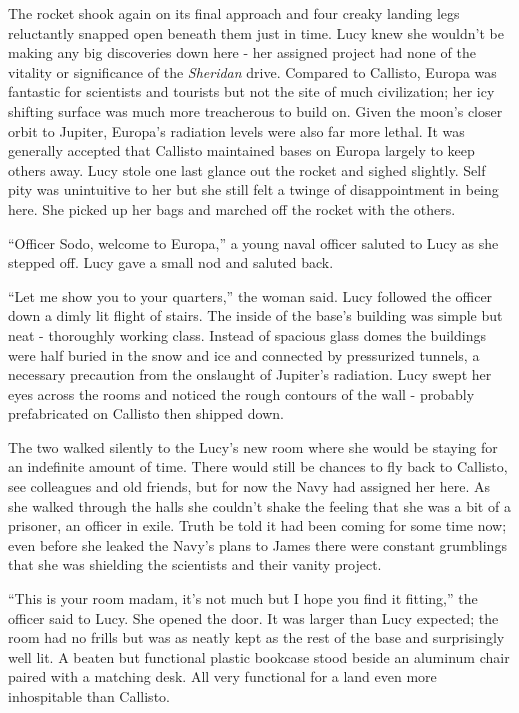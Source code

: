 \documentclass[12pt]{article} %
\begin{document}
The rocket shook again on its final approach and four creaky landing legs reluctantly snapped open beneath them just in time. Lucy knew she wouldn't be making any big discoveries down here - her assigned project had none of the vitality or significance of the \textit{Sheridan}  drive. Compared to Callisto, Europa was fantastic for scientists and tourists but not the site of much civilization; her icy shifting surface was much more treacherous to build on. Given the moon's closer orbit to Jupiter, Europa's radiation levels were also far more lethal. It was generally accepted that Callisto maintained bases on Europa largely to keep others away. Lucy stole one last glance out the rocket and sighed slightly. Self pity was unintuitive to her but she still felt a twinge of disappointment in being here. She picked up her bags and marched off the rocket with the others.

``Officer Sodo, welcome to Europa,'' a young naval officer saluted to Lucy as she stepped off. Lucy gave a small nod and saluted back.

 ``Let me show you to your quarters,'' the woman said. Lucy followed the officer down a dimly lit flight of stairs. The inside of the base's building was simple but neat - thoroughly working class. Instead of spacious glass domes the buildings were half buried in the snow and ice and connected by pressurized tunnels, a necessary precaution from the onslaught of Jupiter's radiation. Lucy swept her eyes across the rooms and noticed the rough contours of the wall - probably prefabricated on Callisto then shipped down.

The two walked silently to the Lucy's new room where she would be staying for an indefinite amount of time. There would still be chances to fly back to Callisto, see colleagues and old friends, but for now the Navy had assigned her here. As she walked through the halls she couldn't shake the feeling that she was a bit of a prisoner, an officer in exile. Truth be told it had been coming for some time now; even before she leaked the Navy's plans to James there were constant grumblings that she was shielding the scientists and their vanity project.

``This is your room madam, it's not much but I hope you find it fitting,'' the officer said to Lucy. She opened the door. It was larger than Lucy expected; the room had no frills but was as neatly kept as the rest of the base and surprisingly well lit. A beaten but functional plastic bookcase stood beside an aluminum chair paired with a matching desk. All very functional for a land even more inhospitable than Callisto.
\end{document}
